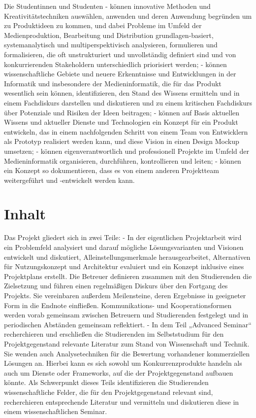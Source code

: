 Die Studentinnen und Studenten - können innovative Methoden und
Kreativitätstechniken auswählen, anwenden und deren Anwendung begründen
um zu Produktideen zu kommen, und dabei Probleme im Umfeld der
Medienproduktion, Bearbeitung und Distribution grundlagen-basiert,
systemanalytisch und multiperspektivisch analysieren, formulieren und
formalisieren, die oft unstrukturiert und unvollständig definiert sind
und von konkurrierenden Stakeholdern unterschiedlich priorisiert werden;
- können wissenschaftliche Gebiete und neuere Erkenntnisse und
Entwicklungen in der Informatik und insbesondere der Medieninformatik,
die für das Produkt wesentlich sein können, identifizieren, den Stand
des Wissens ermitteln und in einem Fachdiskurs darstellen und
diskutieren und zu einem kritischen Fachdiskurs über Potenziale und
Risiken der Ideen beitragen; - können auf Basis aktuellen Wissens und
aktueller Dienste und Technologien ein Konzept für ein Produkt
entwickeln, das in einem nachfolgenden Schritt von einem Team von
Entwicklern als Prototyp realisiert werden kann, und diese Vision in
einen Design Mockup umsetzen; - können eigenverantwortlich und
professionell Projekte im Umfeld der Medieninformatik organisieren,
durchführen, kontrollieren und leiten; - können ein Konzept so
dokumentieren, dass es von einem anderen Projektteam weitergeführt und
-entwickelt werden kann.

\section*{Inhalt\label{/mi-2017/modulbeschreibungen-master/MA_Modul_Projekt_Vision&Konzept}}\label{inhaltpathlabelmi-2017modulbeschreibungen-mastermaux5fmodulux5fprojektux5fvisionkonzept}

Das Projekt gliedert sich in zwei Teile: - In der eigentlichen
Projektarbeit wird ein Problemfeld analysiert und darauf mögliche
Lösungsvarianten und Visionen entwickelt und diskutiert,
Alleinstellungsmerkmale herausgearbeitet, Alternativen für
Nutzungskonzept und Architektur evaluiert und ein Konzept inklusive
eines Projektplans erstellt. Die Betreuer definieren zusammen mit den
Studierenden die Zielsetzung und führen einen regelmäßigen Diskurs über
den Fortgang des Projekts. Sie vereinbaren außerdem Meilensteine, deren
Ergebnisse in geeigneter Form in die Endnote einfließen. Kommunikations-
und Kooperationsformen werden vorab gemeinsam zwischen Betreuern und
Studierenden festgelegt und in periodischen Abständen gemeinsam
reflektiert. - In dem Teil „Advanced Seminar`` recherchieren und
erschließen die Studierenden im Selbststudium für den Projektgegenstand
relevante Literatur zum Stand von Wissenschaft und Technik. Sie wenden
auch Analysetechniken für die Bewertung vorhandener kommerziellen
Lösungen an. Hierbei kann es sich sowohl um Konkurrenzprodukte handeln
als auch um Dienste oder Frameworks, auf die der Projektgegenstand
aufbauen könnte. Als Schwerpunkt dieses Teils identifizieren die
Studierenden wissenschaftliche Felder, die für den Projektgegenstand
relevant sind, recherchieren entsprechende Literatur und vermitteln und
diskutieren diese in einem wissenschaftlichen Seminar.

